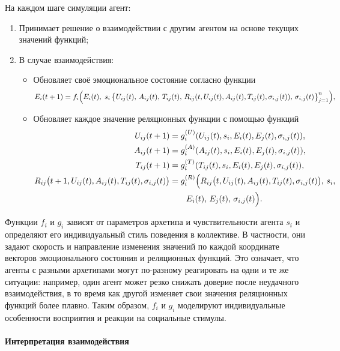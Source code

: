 \documentclass[12pt]{article}
\begin{document}
На каждом шаге симуляции агент:
\begin{enumerate}
    \item Принимает решение о взаимодействии с другим агентом на основе текущих значений функций;
    \item В случае взаимодействия:
    \begin{itemize}
        \item Обновляет своё эмоциональное состояние согласно функции
        \[
        E_i(t+1) = f_i\Bigl(E_i(t),\; s_i\, \bigl\{ U_{ij}(t),\, A_{ij}(t),\, T_{ij}(t),\, R_{ij}(t, U_{ij}(t), A_{ij}(t), T_{ij}(t), \sigma_{i,j}(t)),\, \sigma_{i,j}(t) \bigr\}_{j=1}^n \Bigr),
        \]
        \item Обновляет каждое значение реляционных функции с помощью функций
        \[
        \begin{aligned}
        U_{ij}(t+1) &= g^{(U)}_i(U_{ij}(t), s_i, E_i(t), E_j(t), \sigma_{i,j}(t)), \\
        A_{ij}(t+1) &= g^{(A)}_i(A_{ij}(t), s_i, E_i(t), E_j(t), \sigma_{i,j}(t)), \\
        T_{ij}(t+1) &= g^{(T)}_i(T_{ij}(t), s_i, E_i(t), E_j(t), \sigma_{i,j}(t)), \\
        R_{ij}\bigl(t+1, U_{ij}(t), A_{ij}(t), T_{ij}(t), \sigma_{i,j}(t)\bigr)
        &= g^{(R)}_i\Bigl(R_{ij}\bigl(t, U_{ij}(t), A_{ij}(t), T_{ij}(t), \sigma_{i,j}(t)\bigr),\, s_i, \\
        &\qquad E_i(t),\, E_j(t),\, \sigma_{i,j}(t)\Bigr).
        \end{aligned}
        \]
    \end{itemize}
\end{enumerate}

Функции \( f_i \) и \( g_i \) зависят от параметров архетипа и чувствительности агента \( s_i \) и определяют его индивидуальный стиль поведения в коллективе.
В частности, они задают скорость и направление изменения значений по каждой координате векторов эмоционального состояния и реляционных функций.
Это означает, что агенты с разными архетипами могут по-разному реагировать на одни и те же ситуации:
например, один агент может резко снижать доверие после неудачного взаимодействия, в то время как другой изменяет свои значения реляционных функций более плавно.
Таким образом, \( f_i \) и \( g_i \) моделируют индивидуальные особенности восприятия и реакции на социальные стимулы.
\paragraph{Интерпретация взаимодействия}
\end{document}
